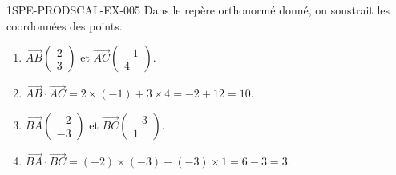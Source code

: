 \begin{corrige}{1SPE-PRODSCAL-EX-005}
Dans le repère orthonormé donné, on soustrait les coordonnées des points.
\begin{enumerate}
\item $\overrightarrow{AB}\begin{pmatrix} 2 \\ 3 \end{pmatrix}$ et $\overrightarrow{AC}\begin{pmatrix} -1 \\ 4 \end{pmatrix}$.
\item $\overrightarrow{AB} \cdot \overrightarrow{AC} = 2 \times (-1) + 3 \times 4 = -2 + 12 = 10$.
\item $\overrightarrow{BA}\begin{pmatrix} -2 \\ -3 \end{pmatrix}$ et $\overrightarrow{BC}\begin{pmatrix} -3 \\ 1 \end{pmatrix}$.
\item $\overrightarrow{BA} \cdot \overrightarrow{BC} = (-2) \times (-3) + (-3) \times 1 = 6 - 3 = 3$.
\end{enumerate}
\end{corrige}
